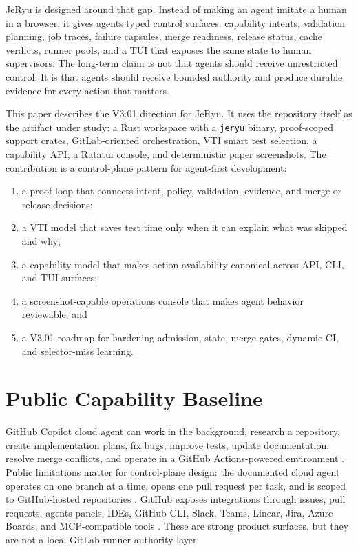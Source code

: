 \documentclass[conference]{IEEEtran}
\begin{document}
JeRyu is designed around that gap. Instead of making an agent imitate a human in a browser, it gives agents typed control surfaces: capability intents, validation planning, job traces, failure capsules, merge readiness, release status, cache verdicts, runner pools, and a TUI that exposes the same state to human supervisors. The long-term claim is not that agents should receive unrestricted control. It is that agents should receive bounded authority and produce durable evidence for every action that matters.

This paper describes the V3.01 direction for JeRyu. It uses the repository itself as the artifact under study: a Rust workspace with a \texttt{jeryu} binary, proof-scoped support crates, GitLab-oriented orchestration, VTI smart test selection, a capability API, a Ratatui console, and deterministic paper screenshots. The contribution is a control-plane pattern for agent-first development:

\begin{enumerate}
\item a proof loop that connects intent, policy, validation, evidence, and merge or release decisions;
\item a VTI model that saves test time only when it can explain what was skipped and why;
\item a capability model that makes action availability canonical across API, CLI, and TUI surfaces;
\item a screenshot-capable operations console that makes agent behavior reviewable; and
\item a V3.01 roadmap for hardening admission, state, merge gates, dynamic CI, and selector-miss learning.
\end{enumerate}

\section{Public Capability Baseline}
GitHub Copilot cloud agent can work in the background, research a repository, create implementation plans, fix bugs, improve tests, update documentation, resolve merge conflicts, and operate in a GitHub Actions-powered environment \cite{github-copilot-cloud-agent}. Public limitations matter for control-plane design: the documented cloud agent operates on one branch at a time, opens one pull request per task, and is scoped to GitHub-hosted repositories \cite{github-copilot-cloud-agent}. GitHub exposes integrations through issues, pull requests, agents panels, IDEs, GitHub CLI, Slack, Teams, Linear, Jira, Azure Boards, and MCP-compatible tools \cite{github-copilot-howto,mcp-spec}. These are strong product surfaces, but they are not a local GitLab runner authority layer.
\end{document}
